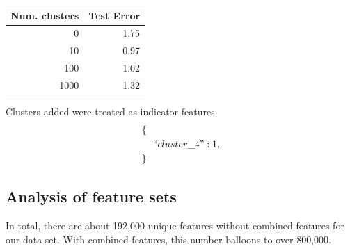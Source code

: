 \documentclass[journal]{IEEEtran}
\begin{document}
\begin{center}
\begin{tabular}{|r| r|} %
\hline
Num. clusters & Test Error  \\ [0.5ex] %
\hline
0 & 1.75 \\
10 & 0.97 \\
100 & 1.02 \\
1000 & 1.32 \\
\hline %
\end{tabular}
\end{center}

Clusters added were treated as indicator features.
\begin{align*}
        \{\ \ &\\
        &``cluster\_4": 1,\\
        \}\ \ &
\end{align*}

\subsection{Analysis of feature sets}
In total, there are about 192,000 unique features without combined features for
our data set.  With combined features, this number balloons to over 800,000.
\begin{center}
\end{center}
\end{document}
